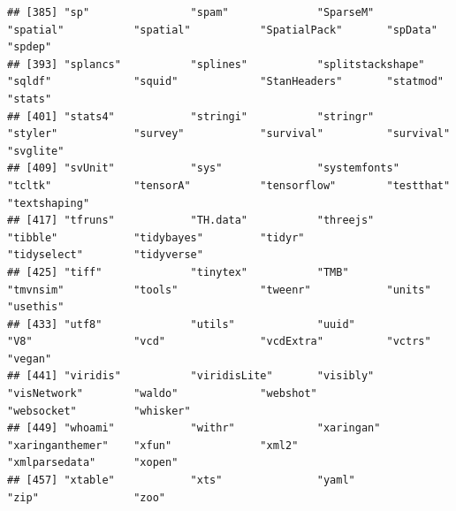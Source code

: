 \documentclass[
  12pt,
]{book}
\begin{document}
\begin{verbatim}
## [385] "sp"                "spam"              "SparseM"           "spatial"           "spatial"           "SpatialPack"       "spData"            "spdep"            
## [393] "splancs"           "splines"           "splitstackshape"   "sqldf"             "squid"             "StanHeaders"       "statmod"           "stats"            
## [401] "stats4"            "stringi"           "stringr"           "styler"            "survey"            "survival"          "survival"          "svglite"          
## [409] "svUnit"            "sys"               "systemfonts"       "tcltk"             "tensorA"           "tensorflow"        "testthat"          "textshaping"      
## [417] "tfruns"            "TH.data"           "threejs"           "tibble"            "tidybayes"         "tidyr"             "tidyselect"        "tidyverse"        
## [425] "tiff"              "tinytex"           "TMB"               "tmvnsim"           "tools"             "tweenr"            "units"             "usethis"          
## [433] "utf8"              "utils"             "uuid"              "V8"                "vcd"               "vcdExtra"          "vctrs"             "vegan"            
## [441] "viridis"           "viridisLite"       "visibly"           "visNetwork"        "waldo"             "webshot"           "websocket"         "whisker"          
## [449] "whoami"            "withr"             "xaringan"          "xaringanthemer"    "xfun"              "xml2"              "xmlparsedata"      "xopen"            
## [457] "xtable"            "xts"               "yaml"              "zip"               "zoo"
\end{verbatim}

\backmatter

  

\printindex
\end{document}
